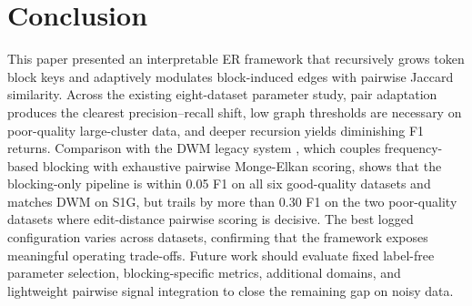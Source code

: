 \documentclass[conference]{IEEEtran}
\begin{document}
\section{Conclusion}
This paper presented an interpretable ER framework that recursively grows token block keys and adaptively modulates block-induced edges with pairwise Jaccard similarity. Across the existing eight-dataset parameter study, pair adaptation produces the clearest precision--recall shift, low graph thresholds are necessary on poor-quality large-cluster data, and deeper recursion yields diminishing F1 returns. Comparison with the DWM legacy system \cite{talburt2020}, which couples frequency-based blocking with exhaustive pairwise Monge-Elkan scoring, shows that the blocking-only pipeline is within 0.05 F1 on all six good-quality datasets and matches DWM on S1G, but trails by more than 0.30 F1 on the two poor-quality datasets where edit-distance pairwise scoring is decisive. The best logged configuration varies across datasets, confirming that the framework exposes meaningful operating trade-offs. Future work should evaluate fixed label-free parameter selection, blocking-specific metrics, additional domains, and lightweight pairwise signal integration to close the remaining gap on noisy data.
\end{document}
